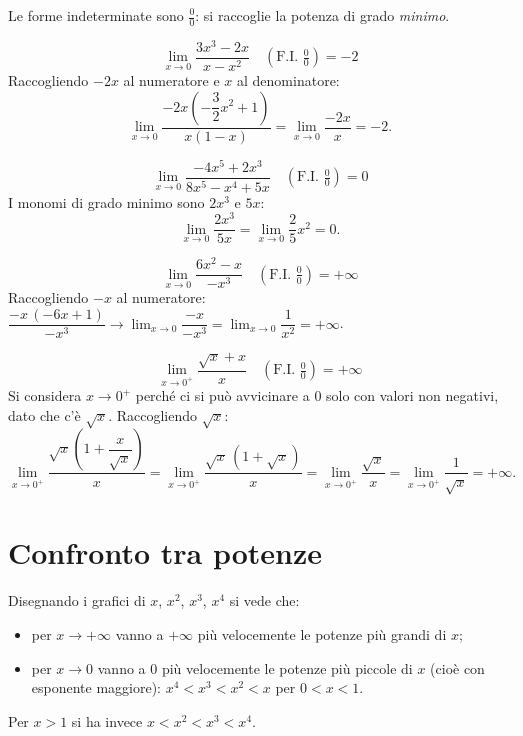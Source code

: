 \documentclass[11pt,a4paper]{article}
\begin{document}
Le forme indeterminate sono $\frac{0}{0}$: si raccoglie la potenza di grado \emph{minimo}.

\begin{esempio}
\[
\lim_{x\to 0}\frac{3x^3 - 2x}{x - x^2} \quad (\text{F.I. } \tfrac{0}{0}) = -2
\]
Raccogliendo $-2x$ al numeratore e $x$ al denominatore:
\[
\lim_{x\to 0}\frac{-2x\left(-\dfrac{3}{2}x^2 + 1\right)}{x(1 - x)} = \lim_{x\to 0}\frac{-2x}{x} = -2 .
\]
\end{esempio}

\begin{esempio}
\[
\lim_{x\to 0}\frac{-4x^5 + 2x^3}{8x^5 - x^4 + 5x} \quad (\text{F.I. } \tfrac{0}{0}) = 0
\]
I monomi di grado minimo sono $2x^3$ e $5x$:
\[
\lim_{x\to 0}\frac{2x^3}{5x} = \lim_{x\to 0}\frac{2}{5}x^2 = 0 .
\]
\end{esempio}

\begin{esempio}
\[
\lim_{x\to 0}\frac{6x^2 - x}{-x^3} \quad (\text{F.I. } \tfrac{0}{0}) = +\infty
\]
Raccogliendo $-x$ al numeratore: $\dfrac{-x\,(-6x + 1)}{-x^3} \to \lim_{x\to 0}\dfrac{-x}{-x^3} = \lim_{x\to 0}\dfrac{1}{x^2} = +\infty$.
\end{esempio}

\begin{esempio}
\[
\lim_{x\to 0^+}\frac{\sqrt{x} + x}{x} \quad (\text{F.I. } \tfrac{0}{0}) = +\infty
\]
Si considera $x \to 0^+$ perché ci si può avvicinare a $0$ solo con valori non negativi, dato che c'è $\sqrt{x}$. Raccogliendo $\sqrt x$:
\[
\lim_{x\to 0^+}\frac{\sqrt{x}\left(1 + \dfrac{x}{\sqrt{x}}\right)}{x} = \lim_{x\to 0^+}\frac{\sqrt{x}\,(1 + \sqrt{x})}{x} = \lim_{x\to 0^+}\frac{\sqrt{x}}{x} = \lim_{x\to 0^+}\frac{1}{\sqrt{x}} = +\infty .
\]
\end{esempio}

\section{Confronto tra potenze}

Disegnando i grafici di $x$, $x^2$, $x^3$, $x^4$ si vede che:
\begin{itemize}
    \item per $x \to +\infty$ vanno a $+\infty$ più velocemente le potenze più grandi di $x$;
    \item per $x \to 0$ vanno a $0$ più velocemente le potenze più piccole di $x$ (cioè con esponente maggiore): $x^4 < x^3 < x^2 < x$ per $0 < x < 1$.
\end{itemize}
Per $x > 1$ si ha invece $x < x^2 < x^3 < x^4$.
\end{document}
